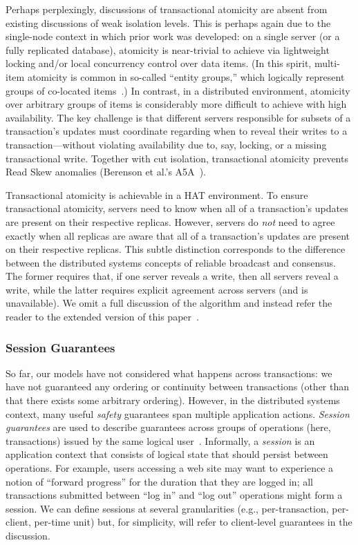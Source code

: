 Perhaps perplexingly, discussions of transactional atomicity are
absent from existing discussions of weak isolation levels. This is
perhaps again due to the single-node context in which prior work was
developed: on a single server (or a fully replicated database),
atomicity is near-trivial to achieve via lightweight locking and/or
local concurrency control over data items. (In this spirit, multi-item
atomicity is common in so-called ``entity groups,'' which logically
represent groups of co-located items~\cite{entitygroup}.) In contrast,
in a distributed environment, atomicity over arbitrary groups of items
is considerably more difficult to achieve with high availability. The
key challenge is that different servers responsible for subsets of a
transaction's updates must coordinate regarding when to reveal their
writes to a transaction---without violating availability due to, say,
locking, or a missing transactional write. Together with cut
isolation, transactional atomicity prevents Read Skew anomalies
(Berenson et al.'s A5A~\cite{ansicritique}).

Transactional atomicity is achievable in a HAT environment. To ensure
transactional atomicity, servers need to know when all of a
transaction's updates are present on their respective
replicas. However, servers do \textit{not} need to agree exactly when
all replicas are aware that all of a transaction's updates are present
on their respective replicas. This subtle distinction corresponds to
the difference between the distributed systems concepts of reliable
broadcast and consensus. The former requires that, if one server
reveals a write, then all servers reveal a write, while the latter
requires explicit agreement across servers (and is unavailable). We
omit a full discussion of the algorithm and instead refer the reader
to the extended version of this paper~\cite{hat-tr}.

\subsubsection{Session Guarantees}

So far, our models have not considered what happens across
transactions: we have not guaranteed any ordering or continuity
between transactions (other than that there exists some arbitrary
ordering). However, in the distributed systems context, many useful
\textit{safety} guarantees span multiple application actions.
\textit{Session guarantees} are used to describe guarantees across
groups of operations (here, transactions) issued by the same logical
user~\cite{sessionguarantees}. Informally, a \textit{session} is an
application context that consists of logical state that should persist
between operations. For example, users accessing a web site may want
to experience a notion of ``forward progress'' for the duration that
they are logged in; all transactions submitted between ``log in'' and
``log out'' operations might form a session. We can define sessions at
several granularities (e.g., per-transaction, per-client, per-time unit)
but, for simplicity, will refer to client-level guarantees in the
discussion.


